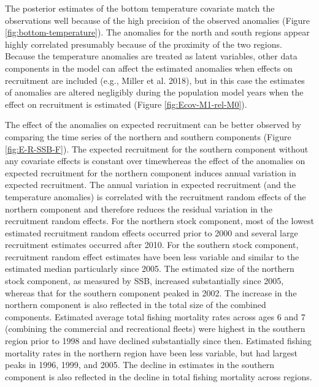 \documentclass[
]{article}
\providecommand{\DIFaddtex}[1]{{\protect\color{blue}\uwave{#1}}} %
\providecommand{\DIFaddbegin}{} %
\providecommand{\DIFaddend}{} %
\providecommand{\DIFadd}[1]{\texorpdfstring{\DIFaddtex{#1}}{#1}} %
\newcommand{\DIFaddincludegraphics}[2][]{{\color{blue}\fbox{\DIFOincludegraphics[#1]{#2}}}} %
\DeclareRobustCommand{\DIFaddbegin}{\DIFOaddbegin \let\includegraphics\DIFaddincludegraphics} %
\DeclareRobustCommand{\DIFaddend}{\DIFOaddend \let\includegraphics\DIFOincludegraphics} %
\begin{document}
The posterior estimates of the bottom temperature covariate match the observations well because of the high precision of the observed anomalies (Figure \ref{fig:bottom-temperature}). The anomalies for the north and south regions appear highly correlated presumably because of the proximity of the two regions. Because the temperature anomalies are treated as latent variables, other data components in the model can affect the estimated anomalies when effects on recruitment are included (e.g., Miller et al. 2018), but in this case the estimates of anomalies are altered negligibly during the population model years when the effect on recruitment is estimated (Figure \ref{fig:Ecov-M1-rel-M0}).

The effect of the anomalies on expected recruitment can be better observed by comparing the time series of the northern and southern components (Figure \ref{fig:E-R-SSB-F}). The expected recruitment for the southern component without any covariate effects is constant over time\DIFaddbegin \DIFadd{, }\DIFaddend whereas the effect of the anomalies on expected recruitment for the northern component induces annual variation in expected recruitment. The annual variation in expected recruitment (and the temperature anomalies) is correlated with the recruitment random effects of the northern component and therefore reduces the residual variation in the recruitment random effects. For the northern stock component, most of the lowest estimated recruitment random effects occurred prior to 2000 and several large recruitment estimates occurred after 2010. For the southern stock component, recruitment random effect estimates have been less variable and similar to the estimated median particularly since 2005. The estimated size of the northern stock component, as measured by SSB, increased substantially since 2005, whereas that for the southern component peaked in 2002. The increase in the northern component is also reflected in the total size of the combined components. Estimated average total fishing mortality rates across ages 6 and 7 (combining the commercial and recreational fleets) were highest in the southern region prior to 1998 and have declined substantially since then. Estimated fishing mortality rates in the northern region have been less variable, but had largest peaks in 1996, 1999, and 2005. The decline in estimates in the southern component is also reflected in the decline in total fishing mortality across regions.
\end{document}
